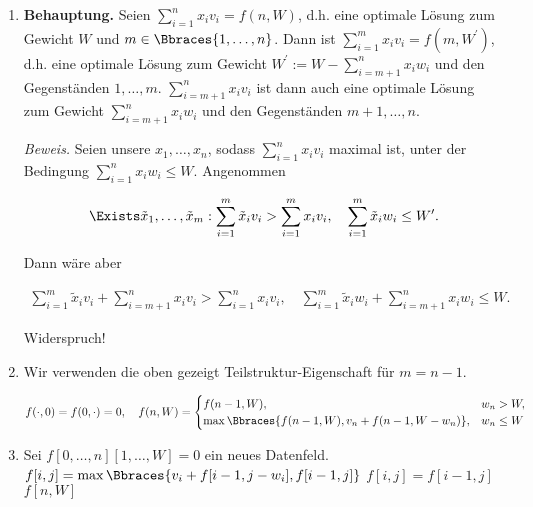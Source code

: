 \begin{solution}

\phantom{}

\begin{enumerate}[label = \alph*]

  \item \textbf{Behauptung.}
  Seien $\sum_{i=1}^n x_i v_i = f(n, W)$, d.h. eine optimale Lösung zum Gewicht $W$ und $m \in \Bbraces{1, \dots, n}$.
  Dann ist $\sum_{i=1}^m x_i v_i = f(m, W^\prime)$, d.h. eine optimale Lösung zum Gewicht $W^\prime := W - \sum_{i=m+1}^n x_i w_i$ und den Gegenständen $1, \dots, m$.
  $\sum_{i=m+1}^n x_i v_i$ ist dann auch eine optimale Lösung zum Gewicht $\sum_{i=m+1}^n x_i w_i$ und den Gegenständen $m + 1, \dots, n$.
  
  \textit{Beweis.}
  Seien unsere $x_1, \dots, x_n$, sodass $\sum_{i=1}^n x_i v_i$ maximal ist, unter der Bedingung $\sum_{i=1}^n x_i w_i \leq W$.
  Angenommen

  \begin{align*}
    \Exists \tilde x_1, \dots, \tilde x_m:
    \sum_{i=1}^m
      \tilde x_i v_i
    >
    \sum_{i=1}^m
      x_i v_i,
    \quad
    \sum_{i=1}^m
      \tilde x_i w_i
    \leq
    W^\prime.
  \end{align*}

  Dann wäre aber

  \begin{align*}
    \sum_{i=1}^m
      \tilde x_i v_i
    +
    \sum_{i=m+1}^n
      x_i v_i
    >
    \sum_{i=1}^n
      x_i v_i,
    \quad
    \sum_{i=1}^m
      \tilde x_i w_i
    +
    \sum_{i=m+1}^n
      x_i w_i
    \leq
    W.
  \end{align*}

  Widerspruch!

  \item Wir verwenden die oben gezeigt Teilstruktur-Eigenschaft für $m = n-1$.

  \begin{align*}
    f(\cdot, 0) = f(0, \cdot) = 0,
    \quad
    f(n, W)
    =
    \begin{cases}
      f(n - 1, W),                                       & w_n > W,   \\
      \max \Bbraces{f(n-1, W), v_n + f(n - 1, W - w_n)}, & w_n \leq W
    \end{cases}
  \end{align*}

  \item

  \begin{algorithmic}
      \State Sei $f[0, \dots, n][1, \dots, W] = 0$ ein neues Datenfeld.
            \State $f[i, j] = \max \Bbraces{v_i + f[i-1, j-w_i], f[i-1, j]}$
          \Else
            \State $f[i, j] = f[i-1, j]$
          \EndIf
        \EndFor
      \EndFor
      \State \Return $f[n, W]$
    \EndProcedure
  \end{algorithmic}

\end{enumerate}

\end{solution}
